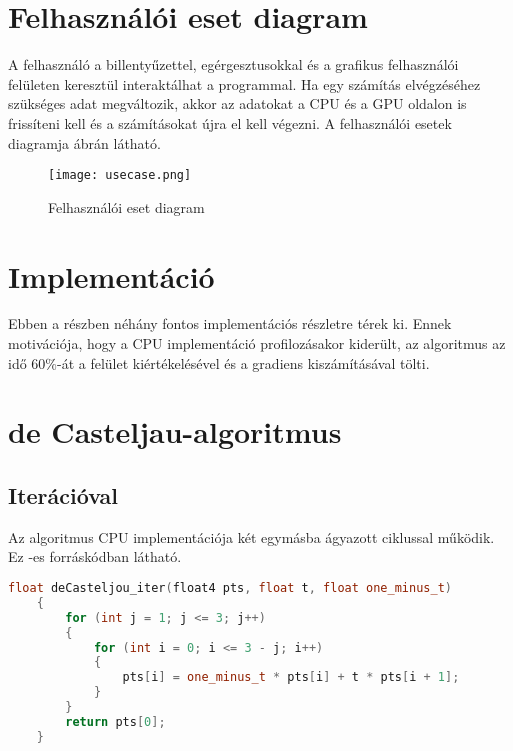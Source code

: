 \section{Felhasználói eset diagram}

A felhasználó a billentyűzettel, egérgesztusokkal és a grafikus felhasználói felületen keresztül interaktálhat a programmal. Ha egy számítás elvégzéséhez szükséges adat megváltozik, akkor az adatokat a CPU és a GPU oldalon is frissíteni kell és a számításokat újra el kell végezni. A felhasználói esetek diagramja  ábrán látható.
\begin{figure}[H]
	\centering
	\texttt{[image: usecase.png]}
	\caption{Felhasználói eset diagram}
	\label{fig:usecase}
\end{figure}


\section{Implementáció}

Ebben a részben néhány fontos implementációs részletre térek ki. Ennek motivációja, hogy a CPU implementáció profilozásakor kiderült, az algoritmus az idő $60\%$-át a felület kiértékelésével és a gradiens kiszámításával tölti.

\section{de Casteljau-algoritmus}
\subsection{Iterációval}
Az algoritmus CPU implementációja két egymásba ágyazott ciklussal működik. Ez -es forráskódban látható.

\begin{lstlisting}[caption={de Casteljau iterációval}, language={C++}, label={lst:iter}]
	float deCasteljou_iter(float4 pts, float t, float one_minus_t)
	{
		for (int j = 1; j <= 3; j++)
		{
			for (int i = 0; i <= 3 - j; i++)
			{
				pts[i] = one_minus_t * pts[i] + t * pts[i + 1];
			}
		}
		return pts[0];
	}
\end{lstlisting}

